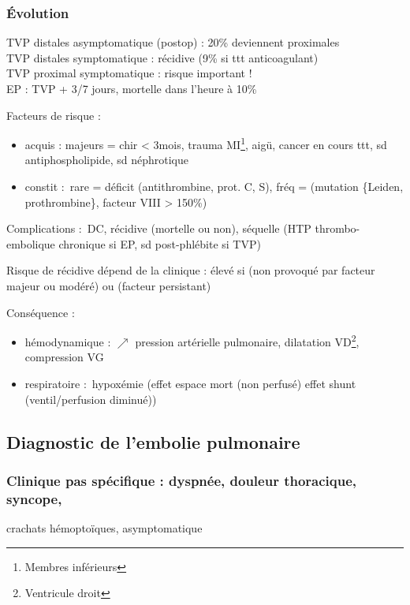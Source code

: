 \documentclass{book}
\begin{document}
\subsubsection{Évolution}
\label{sec:orga7fcc2a}
TVP distales asymptomatique (postop) : 20\% deviennent proximales\\
TVP distales symptomatique : récidive (9\% si ttt anticoagulant)\\
TVP proximal symptomatique : risque important !\\
EP : TVP + 3/7 jours, mortelle dans l'heure à 10\%

Facteurs de risque :

\begin{itemize}
\item acquis : majeurs = chir < 3mois, trauma MI\footnote{Membres inférieurs},
\faHospitalO{} aigü, cancer en cours  ttt, sd antiphospholipide, sd
néphrotique
\item constit : rare = déficit (antithrombine, prot. C, S), fréq = (mutation \{Leiden,
prothrombine\}, facteur VIII > 150\%)
\end{itemize}

Complications : DC, récidive (mortelle ou non), séquelle (HTP thrombo-embolique
chronique si EP, sd post-phlébite si TVP)

Risque de récidive dépend de la clinique : élevé si (non provoqué par facteur
majeur ou modéré) ou (\og facteur persistant)

Conséquence :

\begin{itemize}
\item hémodynamique : \(\nearrow\) pression artérielle pulmonaire, dilatation
VD\footnote{Ventricule droit}, compression VG
\item respiratoire : hypoxémie (effet espace mort (non perfusé) \thus effet shunt
(ventil/perfusion diminué))
\end{itemize}


\subsection{Diagnostic de l'embolie pulmonaire}
\label{sec:orgb7b5d59}

\subsubsection{Clinique pas spécifique : dyspnée, douleur thoracique, syncope,}
\label{sec:org33931e2}
crachats hémoptoïques, asymptomatique
\end{document}
